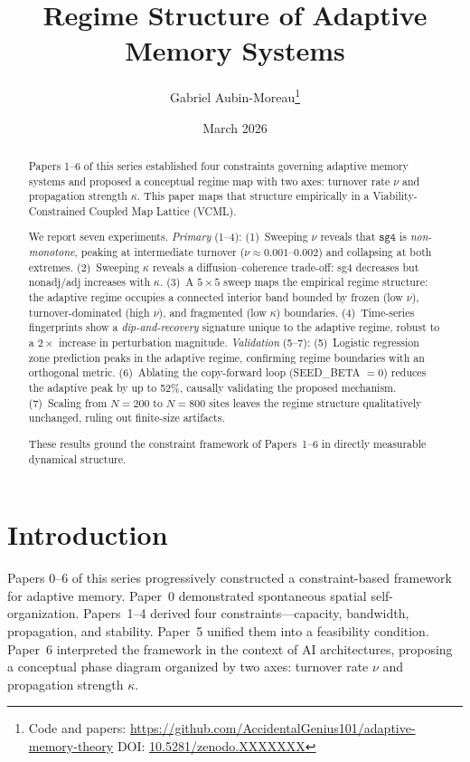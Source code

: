 \documentclass[11pt]{article}
\title{Regime Structure of Adaptive Memory Systems}
\author{Gabriel Aubin-Moreau\thanks{%
  Code and papers:
  \url{https://github.com/AccidentalGenius101/adaptive-memory-theory}
  \quad DOI: \href{https://doi.org/10.5281/zenodo.XXXXXXX}{10.5281/zenodo.XXXXXXX}}}
\date{March 2026}
\theoremstyle{remark}
\begin{document}
\maketitle

\begin{abstract}
Papers 1--6 of this series established four constraints governing adaptive
memory systems and proposed a conceptual regime map with two axes: turnover
rate $\nu$ and propagation strength $\kappa$. This paper maps that structure
empirically in a Viability-Constrained Coupled Map Lattice (VCML).

We report seven experiments. \emph{Primary} (1--4): (1)~Sweeping $\nu$ reveals
that $\mathtt{sg4}$ is \emph{non-monotone}, peaking at intermediate turnover
($\nu \approx 0.001$--$0.002$) and collapsing at both extremes. (2)~Sweeping
$\kappa$ reveals a diffusion--coherence trade-off: sg4 decreases but nonadj/adj
increases with $\kappa$. (3)~A $5\times5$ sweep maps the empirical regime
structure: the adaptive regime occupies a connected interior band bounded by
frozen (low $\nu$), turnover-dominated (high $\nu$), and fragmented (low
$\kappa$) boundaries. (4)~Time-series fingerprints show a \emph{dip-and-recovery}
signature unique to the adaptive regime, robust to a $2\times$ increase in
perturbation magnitude. \emph{Validation} (5--7): (5)~Logistic regression zone
prediction peaks in the adaptive regime, confirming regime boundaries with an
orthogonal metric. (6)~Ablating the copy-forward loop (SEED\_BETA $= 0$)
reduces the adaptive peak by up to 52\%, causally validating the proposed
mechanism. (7)~Scaling from $N = 200$ to $N = 800$ sites leaves the regime
structure qualitatively unchanged, ruling out finite-size artifacts.

These results ground the constraint framework of Papers~1--6 in directly
measurable dynamical structure.
\end{abstract}

\section{Introduction}

Papers 0--6 of this series progressively constructed a constraint-based framework
for adaptive memory. Paper~0 demonstrated spontaneous spatial self-organization.
Papers~1--4 derived four constraints---capacity, bandwidth, propagation, and
stability. Paper~5 unified them into a feasibility condition. Paper~6 interpreted
the framework in the context of AI architectures, proposing a conceptual phase
diagram organized by two axes: turnover rate $\nu$ and propagation strength $\kappa$.
\end{document}
